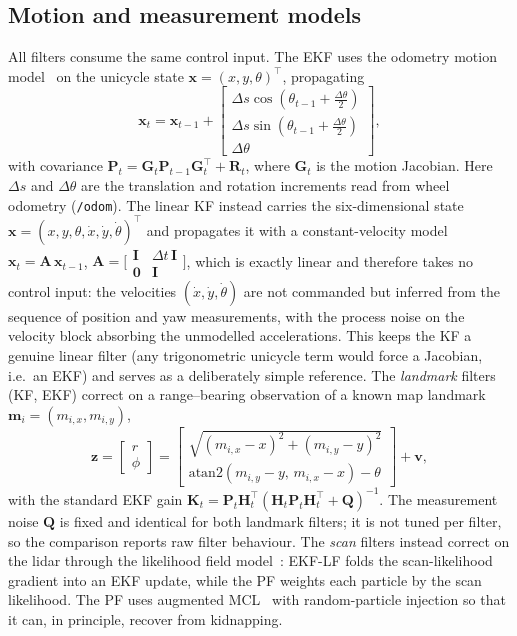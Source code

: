 \documentclass[conference]{IEEEtran}
\begin{document}
\subsection{Motion and measurement models}
All filters consume the same control input. The EKF uses the odometry motion model~\cite{Thrun2005} on the unicycle state $\mathbf{x}=(x,y,\theta)^\top$, propagating
\begin{equation}
\mathbf{x}_t = \mathbf{x}_{t-1} +
\begin{bmatrix} \Delta s\cos(\theta_{t-1}+\tfrac{\Delta\theta}{2})\\ \Delta s\sin(\theta_{t-1}+\tfrac{\Delta\theta}{2})\\ \Delta\theta \end{bmatrix},
\end{equation}
with covariance $\mathbf{P}_t=\mathbf{G}_t\mathbf{P}_{t-1}\mathbf{G}_t^\top+\mathbf{R}_t$, where $\mathbf{G}_t$ is the motion Jacobian. Here $\Delta s$ and $\Delta\theta$ are the translation and rotation increments read from wheel odometry (\texttt{/odom}). The linear KF instead carries the six-dimensional state $\mathbf{x}=(x,y,\theta,\dot x,\dot y,\dot\theta)^\top$ and propagates it with a constant-velocity model $\mathbf{x}_t=\mathbf{A}\,\mathbf{x}_{t-1}$, $\mathbf{A}=\big[\begin{smallmatrix}\mathbf{I} & \Delta t\,\mathbf{I}\\ \mathbf{0} & \mathbf{I}\end{smallmatrix}\big]$, which is exactly linear and therefore takes no control input: the velocities $(\dot x,\dot y,\dot\theta)$ are not commanded but inferred from the sequence of position and yaw measurements, with the process noise on the velocity block absorbing the unmodelled accelerations. This keeps the KF a genuine linear filter (any trigonometric unicycle term would force a Jacobian, i.e.\ an EKF) and serves as a deliberately simple reference. The \emph{landmark} filters (KF, EKF) correct on a range--bearing observation of a known map landmark $\mathbf{m}_i=(m_{i,x},m_{i,y})$,
\begin{equation}
\mathbf{z}=\begin{bmatrix} r \\ \phi \end{bmatrix}=
\begin{bmatrix} \sqrt{(m_{i,x}-x)^2+(m_{i,y}-y)^2} \\ \mathrm{atan2}(m_{i,y}-y,\,m_{i,x}-x)-\theta \end{bmatrix}+\mathbf{v},
\end{equation}
with the standard EKF gain $\mathbf{K}_t=\mathbf{P}_t\mathbf{H}_t^\top(\mathbf{H}_t\mathbf{P}_t\mathbf{H}_t^\top+\mathbf{Q})^{-1}$. The measurement noise $\mathbf{Q}$ is fixed and identical for both landmark filters; it is not tuned per filter, so the comparison reports raw filter behaviour. The \emph{scan} filters instead correct on the lidar through the likelihood field model~\cite{Thrun2005}: EKF-LF folds the scan-likelihood gradient into an EKF update, while the PF weights each particle by the scan likelihood. The PF uses augmented MCL~\cite{Thrun2005} with random-particle injection so that it can, in principle, recover from kidnapping.
\end{document}
